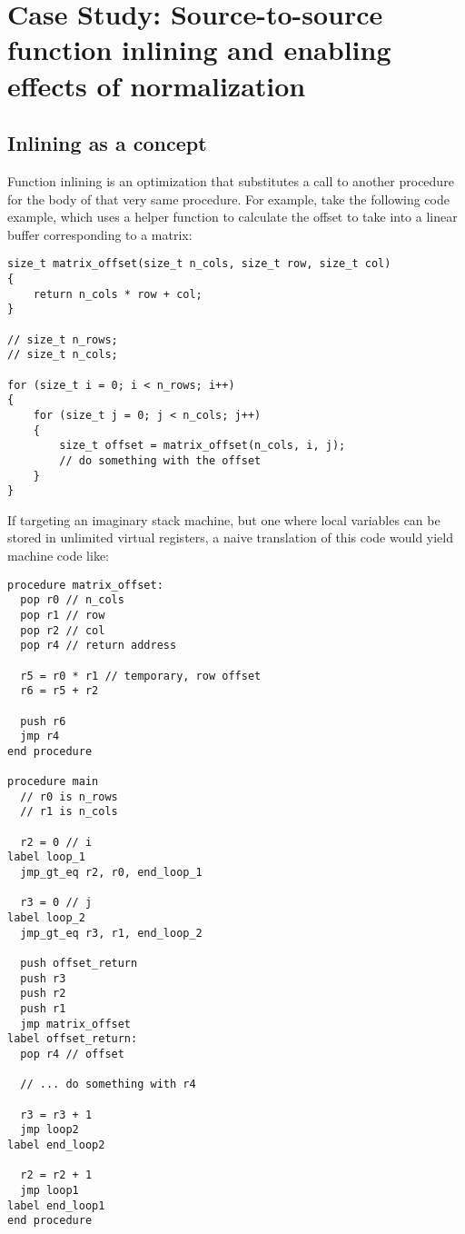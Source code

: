 \chapter{Case Study: Source-to-source function inlining and enabling effects of normalization}\label{chap:inlining}

\section{Inlining as a concept}

Function inlining is an optimization that substitutes a call to another procedure for the body of that very same procedure. For example, take the following code example, which uses a helper function to calculate the offset to take into a linear buffer corresponding to a matrix:

\begin{lstlisting}
size_t matrix_offset(size_t n_cols, size_t row, size_t col)
{
    return n_cols * row + col;
}

// size_t n_rows;
// size_t n_cols;

for (size_t i = 0; i < n_rows; i++)
{
    for (size_t j = 0; j < n_cols; j++)
    {
        size_t offset = matrix_offset(n_cols, i, j);
        // do something with the offset
    }
}
\end{lstlisting}

If targeting an imaginary stack machine, but one where local variables can be stored in unlimited virtual registers, a naive translation of this code would yield machine code like:

\begin{lstlisting}
procedure matrix_offset:
  pop r0 // n_cols
  pop r1 // row
  pop r2 // col
  pop r4 // return address
  
  r5 = r0 * r1 // temporary, row offset
  r6 = r5 + r2
  
  push r6
  jmp r4
end procedure

procedure main
  // r0 is n_rows
  // r1 is n_cols
  
  r2 = 0 // i
label loop_1
  jmp_gt_eq r2, r0, end_loop_1
  
  r3 = 0 // j
label loop_2
  jmp_gt_eq r3, r1, end_loop_2
  
  push offset_return
  push r3
  push r2
  push r1
  jmp matrix_offset
label offset_return:
  pop r4 // offset
  
  // ... do something with r4
  
  r3 = r3 + 1
  jmp loop2
label end_loop2

  r2 = r2 + 1
  jmp loop1
label end_loop1
end procedure
\end{lstlisting}

